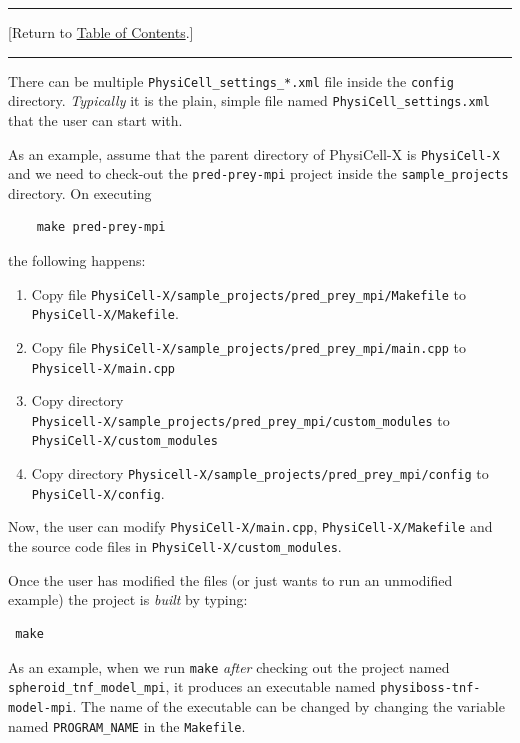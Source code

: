 \documentclass[12pt]{article}
\newcommand{\TOClink}{\begin{center}\hrule\vskip-5pt\phantom{.}\hfill[Return to \hyperlink{TOC}{Table of Contents}.]\hfill\phantom{.}\vskip3pt\hrule\end{center}}
\begin{document}
\TOClink

\begin{tcolorbox}[enhanced,attach boxed title to top center={yshift=-3mm,yshifttext=-1mm},
  colback=blue!5!white,colframe=blue!75!black,colbacktitle=red!80!black,
  title=PhysiCell\_settings.xml,fonttitle=\bfseries,
  boxed title style={size=small,colframe=red!50!black} ]
  There can be multiple \texttt{PhysiCell\_settings\_*.xml} file inside the \texttt{config} directory. \textit{Typically} it is the plain, simple file named \texttt{PhysiCell\_settings.xml} that the user can start with. 
\end{tcolorbox}

As an example, assume that the parent directory of PhysiCell-X is \texttt{PhysiCell-X} and we need to check-out the \texttt{pred-prey-mpi} project inside the \texttt{sample\_projects} directory. On executing 
\begin{verbatim}
    make pred-prey-mpi
\end{verbatim}
the following happens:
\begin{enumerate}
    \item Copy file \texttt{PhysiCell-X/sample\_projects/pred\_prey\_mpi/Makefile} to \texttt{PhysiCell-X/Makefile}.
    \item Copy file \texttt{PhysiCell-X/sample\_projects/pred\_prey\_mpi/main.cpp} to \texttt{Physicell-X/main.cpp}
    \item Copy directory\\ \texttt{Physicell-X/sample\_projects/pred\_prey\_mpi/custom\_modules} to \texttt{PhysiCell-X/custom\_modules}
    \item Copy directory \texttt{Physicell-X/sample\_projects/pred\_prey\_mpi/config} to \texttt{PhysiCell-X/config}. 
\end{enumerate}

Now, the user can modify \texttt{PhysiCell-X/main.cpp}, \texttt{PhysiCell-X/Makefile} and the source code files in \texttt{PhysiCell-X/custom\_modules}. 

Once the user has modified the files (or just wants to run an unmodified example) the project is \textit{built} by typing:

\begin{verbatim}
 make   
\end{verbatim}

As an example, when we run \texttt{make} \textit{after} checking out the project named \texttt{spheroid\_tnf\_model\_mpi}, it produces an executable named \texttt{physiboss-tnf-model-mpi}. The name of the executable can be changed by changing the variable named \texttt{PROGRAM\_NAME} in the \texttt{Makefile}. 
\end{document}
